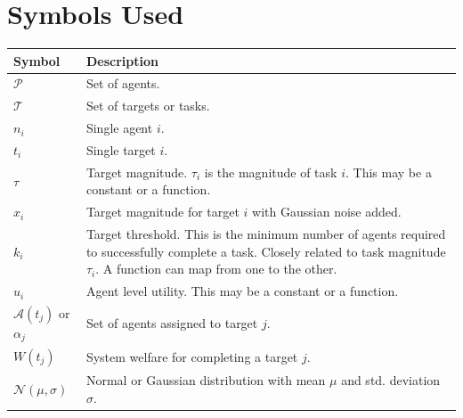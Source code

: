 \documentclass[12pt]{book}
\newcommand{\Pl}{\mathcal{P}} %
\newcommand{\Ta}{\mathcal{T}} %
\begin{document}
\newpage
\section*{Symbols Used}
\begin{center}
\begin{table}[!ht]
\centering\begin{tabular}{lp{8.5cm}}
	\textbf{Symbol} & \textbf{Description}\\
	\hline
	$\Pl$ & Set of agents.\\
	$\Ta$ & Set of targets or tasks.\\
	$n_i$ & Single agent $i$.\\
	$t_i$ & Single target $i$.\\
	$\tau$ & Target magnitude. $\tau_i$ is the magnitude of task $i$. This may be a constant or a function.\\
	$x_i$ & Target magnitude for target $i$ with Gaussian noise added.\\
	$k_i$ & Target threshold. This is the minimum number of agents required to successfully complete a task. Closely related to task magnitude $\tau_i$. A function can map from one to the other.\\
	$u_i$ & Agent level utility. This may be a constant or a function.\\
	$\mathcal{A}(t_j)$ or $\alpha_j$ & Set of agents assigned to target $j$.\\
	$W(t_j)$ & System welfare for completing a target $j$.\\
	$\mathcal{N}(\mu, \sigma)$ & Normal or Gaussian distribution with mean $\mu$ and std. deviation $\sigma$.\\
\end{tabular}
\end{table}
\end{center}

\tableofcontents

\pagestyle{contentStyle}
\end{document}
